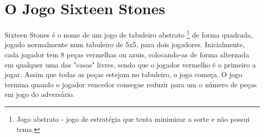 \documentclass[a4paper]{article}
\begin{document}

\newpage

%
%
%
%
%
%
%


\section{O Jogo Sixteen Stones}

Sixteen Stones é o nome de um jogo de tabuleiro abstrato \footnote{Jogo abstrato - jogo de estratégia que tenta minimizar a sorte e não possui tema.} de forma quadrada, jogado normalmente num tabuleiro de 5x5, para dois jogadores. Inicialmente, cada jogador tem 8 peças vermelhas ou azuis, colocando-as de forma alternada em qualquer uma das "casas" livres, sendo que o jogador vermelho é o primeiro a jogar. Assim que todas as peças estejam no tabuleiro, o jogo começa. O jogo termina quando o jogador vencedor consegue reduzir para um o número de peças em jogo do adversário.
\end{document}
